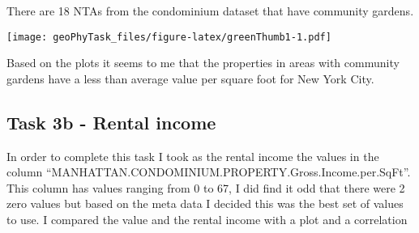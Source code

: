 \documentclass[]{article}
\newenvironment{Shaded}{\begin{snugshade}}{\end{snugshade}}
\newcommand{\KeywordTok}[1]{\textcolor[rgb]{0.13,0.29,0.53}{\textbf{#1}}}
\newcommand{\DataTypeTok}[1]{\textcolor[rgb]{0.13,0.29,0.53}{#1}}
\newcommand{\DecValTok}[1]{\textcolor[rgb]{0.00,0.00,0.81}{#1}}
\newcommand{\StringTok}[1]{\textcolor[rgb]{0.31,0.60,0.02}{#1}}
\newcommand{\OperatorTok}[1]{\textcolor[rgb]{0.81,0.36,0.00}{\textbf{#1}}}
\newcommand{\NormalTok}[1]{#1}
\begin{document}
There are 18 NTAs from the condominium dataset that have community
gardens.

\begin{Shaded}
\end{Shaded}

\texttt{[image: geoPhyTask\_files/figure-latex/greenThumb1-1.pdf]}

Based on the plots it seems to me that the properties in areas with
community gardens have a less than average value per square foot for New
York City.

\subsection{Task 3b - Rental income}\label{task-3b---rental-income}

In order to complete this task I took as the rental income the values in
the column ``MANHATTAN.CONDOMINIUM.PROPERTY.Gross.Income.per.SqFt''.
This column has values ranging from 0 to 67, I did find it odd that
there were 2 zero values but based on the meta data I decided this was
the best set of values to use. I compared the value and the rental
income with a plot and a correlation

\begin{Shaded}
\end{Shaded}
\end{document}
